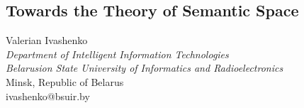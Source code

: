 \documentclass {article}
\begin{document}
\setlength{\parskip}{6pt}
\begin{center}
\chapter{ \leftskip=40mm { \huge\textbf{Towards the Theory of Semantic Space}}}
\vspace{0.3in}
    \newline
    
\large
 Valerian Ivashenko\\
  \textit{Department of Intelligent Information Technologies}\\
   \textit{Belarusion State University of Informatics and Radioelectronics
}\\
 Minsk, Republic of Belarus\\
    ivashenko@bsuir.by
\end{center}
\vspace{0.3in}
\end{document}
